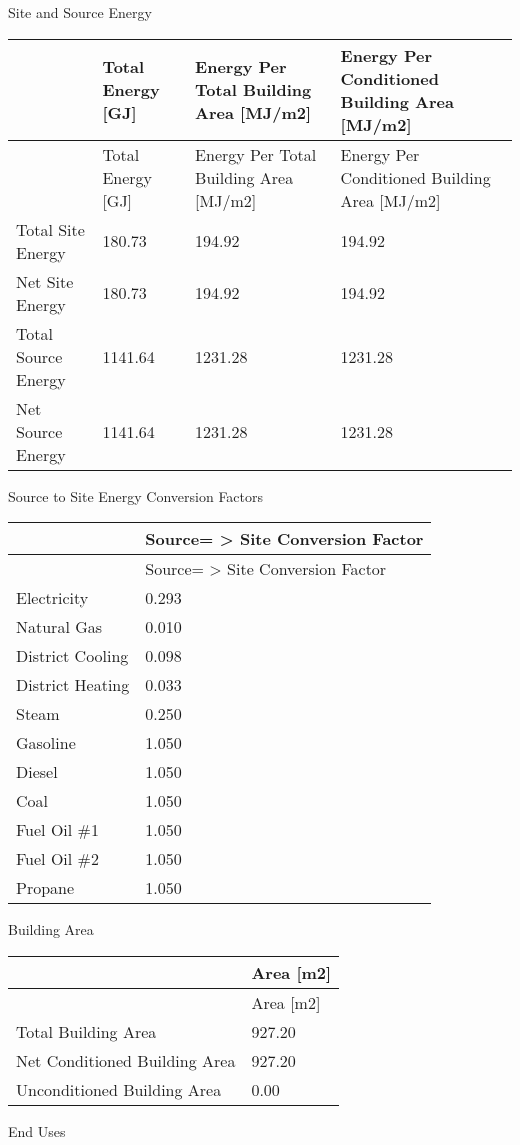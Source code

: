 Site and Source Energy

\begin{longtable}[c]{p{1.5in}p{1.5in}p{1.5in}p{1.5in}}
\toprule 
~ & Total Energy [GJ] & Energy Per Total Building Area [MJ/m2] & Energy Per Conditioned Building Area [MJ/m2] \tabularnewline
\midrule
\endfirsthead

\toprule 
~ & Total Energy [GJ] & Energy Per Total Building Area [MJ/m2] & Energy Per Conditioned Building Area [MJ/m2] \tabularnewline
\midrule
\endhead

Total Site Energy & 180.73 & 194.92 & 194.92 \tabularnewline
Net Site Energy & 180.73 & 194.92 & 194.92 \tabularnewline
Total Source Energy & 1141.64 & 1231.28 & 1231.28 \tabularnewline
Net Source Energy & 1141.64 & 1231.28 & 1231.28 \tabularnewline
\bottomrule
\end{longtable}

Source to Site Energy Conversion Factors

\begin{longtable}[c]{@{}ll@{}}
\toprule 
~ & Source= > Site Conversion Factor \tabularnewline
\midrule
\endfirsthead

\toprule 
~ & Source= > Site Conversion Factor \tabularnewline
\midrule
\endhead

Electricity & 0.293 \tabularnewline
Natural Gas & 0.010 \tabularnewline
District Cooling & 0.098 \tabularnewline
District Heating & 0.033 \tabularnewline
Steam & 0.250 \tabularnewline
Gasoline & 1.050 \tabularnewline
Diesel & 1.050 \tabularnewline
Coal & 1.050 \tabularnewline
Fuel Oil \#1 & 1.050 \tabularnewline
Fuel Oil \#2 & 1.050 \tabularnewline
Propane & 1.050 \tabularnewline
\bottomrule
\end{longtable}

Building Area

\begin{longtable}[c]{@{}ll@{}}
\toprule 
~ & Area [m2] \tabularnewline
\midrule
\endfirsthead

\toprule 
~ & Area [m2] \tabularnewline
\midrule
\endhead

Total Building Area & 927.20 \tabularnewline
Net Conditioned Building Area & 927.20 \tabularnewline
Unconditioned Building Area & 0.00 \tabularnewline
\bottomrule
\end{longtable}

End Uses

